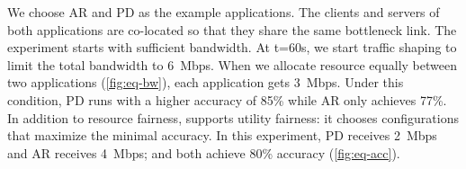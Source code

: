 We choose AR and PD as the example applications.  The clients and servers of
both applications are co-located so that they share the same bottleneck
link. The experiment starts with sufficient bandwidth. At t=60s, we start
traffic shaping to limit the total bandwidth to \SI{6}{Mbps}. When we allocate
resource equally between two applications (\autoref{fig:eq-bw}), each
application gets \SI{3}{Mbps}. Under this condition, PD runs with a higher
accuracy of 85\% while AR only achieves 77\%. In addition to resource fairness,
\awstream{} supports utility fairness: it chooses configurations that maximize
the minimal accuracy. In this experiment, PD receives \SI{2}{Mbps} and AR
receives \SI{4}{Mbps}; and both achieve 80\% accuracy (\autoref{fig:eq-acc}).


